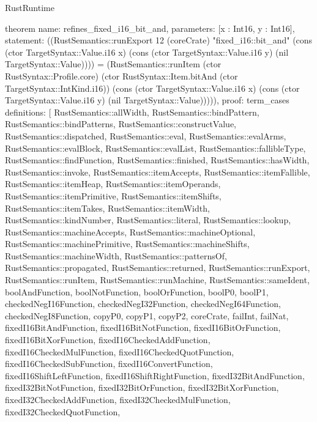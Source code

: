 \begin{lexlean}{RustRuntime}
\begin{semanticmodule}
theorem{
  name: refines_fixed_i16_bit_and,
  parameters: [x : Int16, y : Int16],
  statement: ((RustSemantics::runExport 12 (coreCrate) "fixed_i16::bit_and" (cons (ctor TargetSyntax::Value.i16 x) (cons (ctor TargetSyntax::Value.i16 y) (nil TargetSyntax::Value)))) = (RustSemantics::runItem (ctor RustSyntax::Profile.core) (ctor RustSyntax::Item.bitAnd (ctor TargetSyntax::IntKind.i16)) (cons (ctor TargetSyntax::Value.i16 x) (cons (ctor TargetSyntax::Value.i16 y) (nil TargetSyntax::Value))))),
  proof: term_cases{
    definitions: [
      RustSemantics::allWidth,
      RustSemantics::bindPattern,
      RustSemantics::bindPatterns,
      RustSemantics::constructValue,
      RustSemantics::dispatched,
      RustSemantics::eval,
      RustSemantics::evalArms,
      RustSemantics::evalBlock,
      RustSemantics::evalList,
      RustSemantics::fallibleType,
      RustSemantics::findFunction,
      RustSemantics::finished,
      RustSemantics::hasWidth,
      RustSemantics::invoke,
      RustSemantics::itemAccepts,
      RustSemantics::itemFallible,
      RustSemantics::itemHeap,
      RustSemantics::itemOperands,
      RustSemantics::itemPrimitive,
      RustSemantics::itemShifts,
      RustSemantics::itemTakes,
      RustSemantics::itemWidth,
      RustSemantics::kindNumber,
      RustSemantics::literal,
      RustSemantics::lookup,
      RustSemantics::machineAccepts,
      RustSemantics::machineOptional,
      RustSemantics::machinePrimitive,
      RustSemantics::machineShifts,
      RustSemantics::machineWidth,
      RustSemantics::patternsOf,
      RustSemantics::propagated,
      RustSemantics::returned,
      RustSemantics::runExport,
      RustSemantics::runItem,
      RustSemantics::runMachine,
      RustSemantics::sameIdent,
      boolAndFunction,
      boolNotFunction,
      boolOrFunction,
      boolP0,
      boolP1,
      checkedNegI16Function,
      checkedNegI32Function,
      checkedNegI64Function,
      checkedNegI8Function,
      copyP0,
      copyP1,
      copyP2,
      coreCrate,
      failInt,
      failNat,
      fixedI16BitAndFunction,
      fixedI16BitNotFunction,
      fixedI16BitOrFunction,
      fixedI16BitXorFunction,
      fixedI16CheckedAddFunction,
      fixedI16CheckedMulFunction,
      fixedI16CheckedQuotFunction,
      fixedI16CheckedSubFunction,
      fixedI16ConvertFunction,
      fixedI16ShiftLeftFunction,
      fixedI16ShiftRightFunction,
      fixedI32BitAndFunction,
      fixedI32BitNotFunction,
      fixedI32BitOrFunction,
      fixedI32BitXorFunction,
      fixedI32CheckedAddFunction,
      fixedI32CheckedMulFunction,
      fixedI32CheckedQuotFunction,
}}
\end{semanticmodule}
\end{lexlean}
